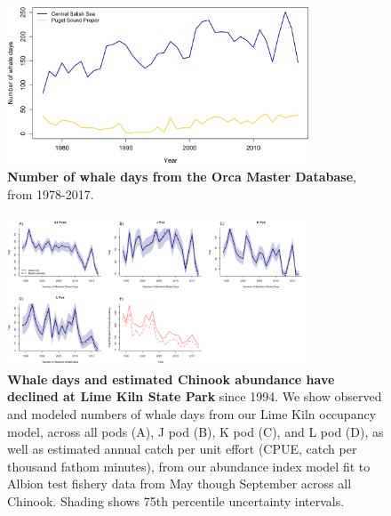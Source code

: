 \documentclass{article}
\begin{document}
\begin{figure}[!hp]
\includegraphics[width=0.8\textwidth]{../analyses/figures/OrcaPhenPlots/whaledays_assumeSRKW2regs.png} 
\caption{\textbf{Number of whale days from the Orca Master Database}, from 1978-2017. }
\label{fig:wdays}
\end{figure}


\begin{figure}[!hp]
\includegraphics[width=0.8\textwidth]{../analyses/orcaphen/figures/modwhaledays_lime.png} 
\caption{\textbf{Whale days and estimated Chinook abundance have declined at Lime Kiln State Park} since 1994. We show observed and modeled numbers of whale days from our Lime Kiln occupancy model, across all pods (A), J pod (B), K pod (C), and L pod (D), as well as estimated annual catch per unit effort (CPUE, catch per thousand fathom minutes), from our abundance index model fit to Albion test fishery data from May though September across all Chinook. Shading shows 75th percentile uncertainty intervals.}
\label{fig:mlimewdays}
 \end{figure}
 
\end{document}
